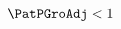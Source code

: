\begin{equation}\begin{gathered}\begin{aligned}
  \PatPGroAdj  & < 1 \label{eq:GIC}
\end{aligned}\end{gathered}\end{equation}
